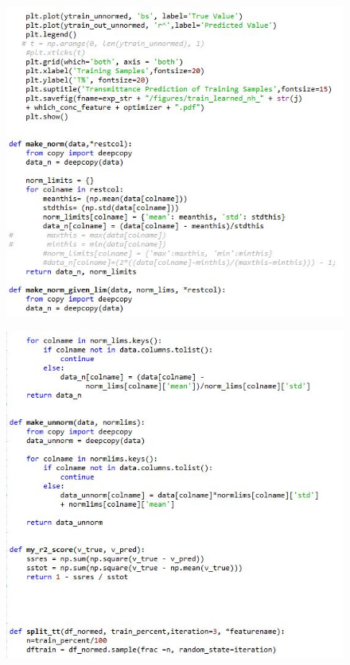 \documentclass[]{article}
\begin{document}
\begin{figure}
\centering
\includegraphics[width=1\textwidth,height=\textheight]{images/utility2.jpg}
\end{figure}

\begin{figure}
\centering
\includegraphics[width=1\textwidth,height=\textheight]{images/utility3.jpg}
\end{figure}
\end{document}
